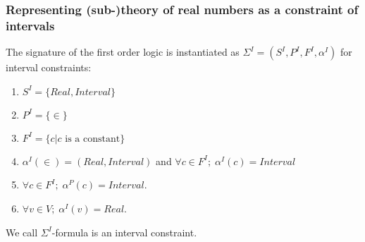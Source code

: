 \subsubsection*{Representing (sub-)theory of real numbers as a constraint of intervals}
The signature of the first order logic is instantiated as $\Sigma^I = (S^I, P^I, F^I, \alpha^I)$ for interval constraints:
\begin{enumerate}
\item $S^I = \{Real, Interval\}$
\item $P^I = \{\in\}$
\item $F^I = \{c | c \text{ is a constant}\}$
\item $\alpha^I(\in) = (Real, Interval)$ and $\forall c \in F^I; \; \alpha^I(c) = Interval$
\item $\forall c \in F^I; \; \alpha^P(c) = Interval$.
\item $\forall v \in V; \; \alpha^I(v) = Real$.
\end{enumerate}
We call $\Sigma^I$-formula is an interval constraint.



